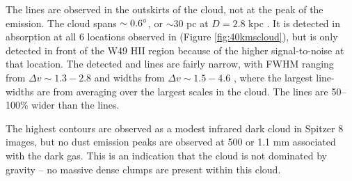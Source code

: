 The \formaldehyde lines are observed in the outskirts of the cloud, not at
the peak of the \thirteenco emission.  The cloud spans $\sim0.6^{\circ}$, or
$\sim30$ pc at $D=2.8$ kpc \citep{Roman-Duval2009a}.  It is detected in \oneone
absorption at all 6 locations observed in \formaldehyde (Figure
\ref{fig:40kmscloud}), but \twotwo is only detected in front of the W49 HII
region because of the higher signal-to-noise at that location.  The detected
\thirteenco and \formaldehyde lines are fairly narrow, with \formaldehyde FWHM
ranging from $\Delta v \sim1.3-2.8$ \kms and \thirteenco widths from $\Delta v
\sim1.5-4.6$ \kms, where the largest line-widths are from averaging over the
largest scales in the cloud.  The \thirteenco lines are 50--100\% wider than the
\formaldehyde lines.

The highest \thirteenco contours are observed as a modest infrared dark cloud
in Spitzer 8 \um images, but no dust emission peaks are observed at 500 \um
\citep[Herschel;][]{Traficante2011a} or 1.1 mm
\citep[Bolocam;][]{Aguirre2011a,Ginsburg2013a} associated with the dark gas.
This is an indication that the cloud is not dominated by gravity -- no
massive dense clumps are present within this cloud.


